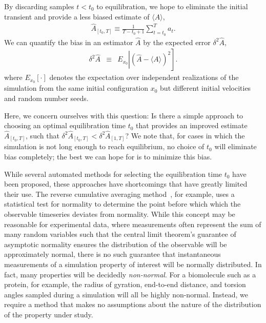 \documentclass[aps,pre,twocolumn,nofootinbib,superscriptaddress,linenumbers,11point]{revtex4-1}
\newcommand{\expect}[1]{\langle #1 \rangle}                %
\begin{document}
By discarding samples $t < t_0$ to equilibration, we hope to eliminate the initial transient and provide a less biased estimate of $\expect{A}$,
\begin{eqnarray}
\hat{A}_{[t_0,T]} \equiv \frac{1}{T-t_0+1} \sum_{t=t_0}^T a_t . \label{equation:production-time-average} 
\end{eqnarray}
We can quantify the bias in an estimator $\hat{A}$ by the expected error $\delta^2 \hat{A}$,
\begin{eqnarray}
\delta^2 \hat{A} &\equiv& E_{x_0} \left| \left( \hat{A} - \expect{A} \right)^2 \right] . \label{equation:error} 
\end{eqnarray}
where $E_{x_0}[\cdot]$ denotes the expectation over independent realizations of the simulation from the same initial configuration $x_0$ but different initial velocities and random number seeds.

Here, we concern ourselves with this question: 
Is there a simple approach to choosing an optimal equilibration time $t_0$ that provides an improved estimate $\hat{A}_{[t_0,T]}$, such that $\delta^2 \hat{A}_{[t_0,T]} < \delta^2 \hat{A}_{[1,T]}$?
We note that, for cases in which the simulation is not long enough to reach equilibrium, no choice of $t_0$ will eliminate bias completely; the best we can hope for is to minimize this bias.

While several automated methods for selecting the equilibration time $t_0$ have been proposed, these approaches have shortcomings that have greatly limited their use.
The reverse cumulative averaging method~\cite{yang-karplus:2004:jcp:reverse-cumulative-averaging}, for example, uses a statistical test for normality to determine the point before which which the observable timeseries deviates from normality.
While this concept may be reasonable for experimental data, where measurements often represent the sum of many random variables such that the central limit theorem's guarantee of asymptotic normality ensures the distribution of the observable will be approximately normal, there is no such guarantee that instantaneous measurements of a simulation property of interest will be normally distributed.
In fact, many properties will be decidedly \emph{non-normal}.
For a biomolecule such as a protein, for example, the radius of gyration, end-to-end distance, and torsion angles sampled during a simulation will all be highly non-normal.
Instead, we require a method that makes no assumptions about the nature of the distribution of the property under study.
\end{document}
